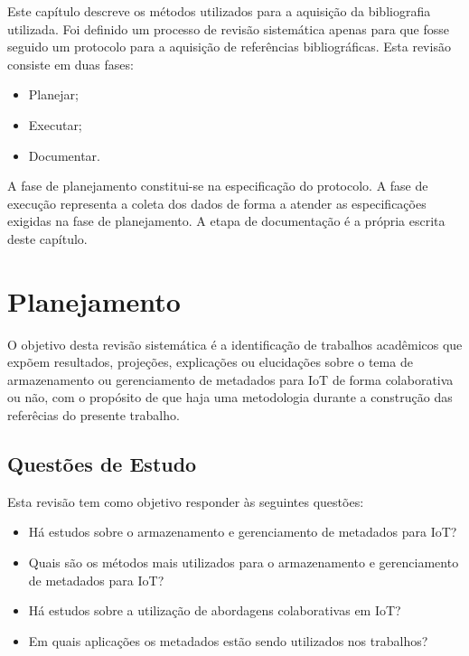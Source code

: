 \newcommand{\texCommand}[1]{\texttt{\textbackslash{#1}}}%

\newcommand{\exemplo}[1]{%
\vspace{\baselineskip}%
\noindent\fbox{\begin{minipage}{\textwidth}#1\end{minipage}}%
\\\vspace{\baselineskip}}%

\newcommand{\exemploVerbatim}[1]{%
\vspace{\baselineskip}%
\noindent\fbox{\begin{minipage}{\textwidth}%
#1\end{minipage}}%
\\\vspace{\baselineskip}}%


\quad Este capítulo descreve os métodos utilizados para a aquisição da bibliografia utilizada. Foi definido um processo de revisão sistemática apenas para que fosse seguido um protocolo para a aquisição de referências bibliográficas. Esta revisão consiste em duas fases:
\begin{itemize}
  \item Planejar;
  \item Executar;
  \item Documentar.
\end{itemize}
\quad A fase de planejamento constitui-se na especificação do protocolo.
A fase de execução representa a coleta dos dados de forma a atender as especificações
exigidas na fase de planejamento. A etapa de documentação é a própria escrita deste capítulo.

\section{Planejamento}
\quad O objetivo desta revisão sistemática é a identificação de trabalhos acadêmicos
que expõem resultados, projeções, explicações ou elucidações sobre o tema de armazenamento ou gerenciamento
de metadados para \acrlong{IoT} de forma colaborativa ou não, com o propósito de que haja uma metodologia durante a construção das referêcias do presente trabalho.

\subsection{Questões de Estudo}
\quad Esta revisão tem como objetivo responder às seguintes questões:
\begin{itemize}
  \item Há estudos sobre o armazenamento e gerenciamento de metadados para \acrlong{IoT}?
  \item Quais são os métodos mais utilizados para o armazenamento e gerenciamento de metadados para \acrshort{IoT}?
  \item Há estudos sobre a utilização de abordagens colaborativas em \acrlong{IoT}?
  \item Em quais aplicações os metadados estão sendo utilizados nos trabalhos?
\end{itemize}

